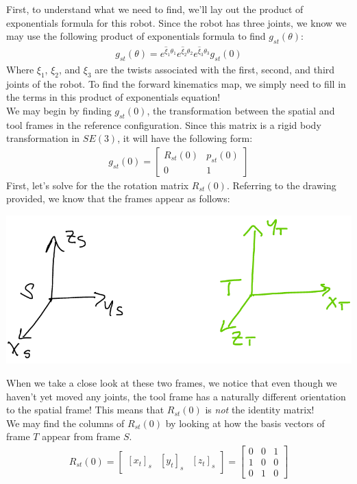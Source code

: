 \documentclass[oneside]{book}
\begin{document}
First, to understand what we need to find, we'll lay out the product of exponentials formula for this robot. Since the robot has three joints, we know we may use the following product of exponentials formula to find $g_{st}(\theta)$:
\begin{align}
    g_{st}(\theta) = e^{\hat\xi_1\theta_1}e^{\hat\xi_2\theta_2}e^{\hat\xi_3\theta_3}g_{st}(0)
\end{align}
Where $\xi_1$, $\xi_2$, and $\xi_3$ are the twists associated with the first, second, and third joints of the robot. To find the forward kinematics map, we simply need to fill in the terms in this product of exponentials equation!\\
We may begin by finding $g_{st}(0)$, the transformation between the spatial and tool frames in the reference configuration. Since this matrix is a rigid body transformation in $SE(3)$, it will have the following form:
\begin{align}
    g_{st}(0) = 
    \begin{bmatrix}
        R_{st}(0) & p_{st}(0) \\
        0 & 1
    \end{bmatrix}
\end{align}
First, let's solve for the the rotation matrix $R_{st}(0)$. Referring to the drawing provided, we know that the frames appear as follows:
\begin{center}
    \includegraphics[scale=0.25]{images/spatialTool.png}
\end{center}
When we take a close look at these two frames, we notice that even though we haven't yet moved any joints, the tool frame has a naturally different orientation to the spatial frame! This means that $R_{st}(0)$ is \textit{not} the identity matrix!\\
We may find the columns of $R_{st}(0)$ by looking at how the basis vectors of frame $T$ appear from frame $S$.
\begin{align}
    R_{st}(0) = \begin{bmatrix}
        [x_t]_s & [y_t]_s & [z_t]_s
    \end{bmatrix}
    = 
    \begin{bmatrix}
        0 & 0 & 1\\
        1 & 0 & 0\\
        0 & 1 & 0
    \end{bmatrix}
\end{align}
\end{document}
